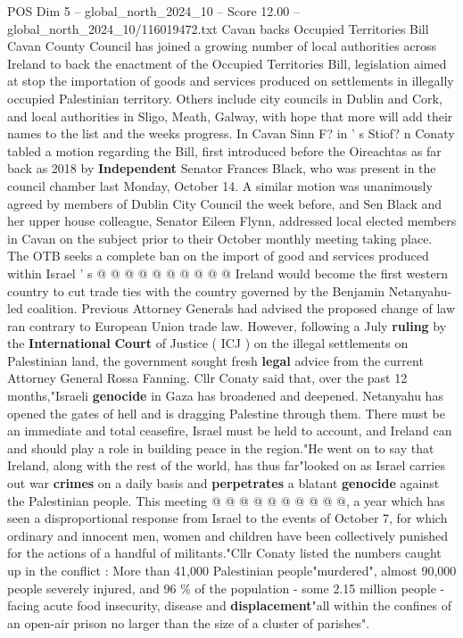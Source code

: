 \begin{textsample}{POS Dim 5 – global\_north\_2024\_10 – Score 12.00 – global\_north\_2024\_10/116019472.txt}  \label{ex:f5_pos_407}
Cavan backs Occupied Territories Bill Cavan County Council has joined a growing number of local authorities across Ireland to back the enactment of the Occupied Territories Bill, legislation aimed at stop the importation of goods and services produced on settlements in illegally occupied Palestinian territory.
Others include city councils in Dublin and Cork, and local authorities in Sligo, Meath, Galway, with hope that more will add their names to the list and the weeks progress.
In Cavan Sinn F? in ' s Stiof? n Conaty tabled a motion regarding the Bill, first introduced before the Oireachtas as far back as 2018 by \textbf{Independent} Senator Frances Black, who was present in the council chamber last Monday, October 14.
A similar motion was unanimously agreed by members of Dublin City Council the week before, and Sen Black and her upper house colleague, Senator Eileen Flynn, addressed local elected members in Cavan on the subject prior to their October monthly meeting taking place.
The OTB seeks a complete ban on the import of good and services produced within Israel ' s @ @ @ @ @ @ @ @ @ @ Ireland would become the first western country to cut trade ties with the country governed by the Benjamin Netanyahu-led coalition.
Previous Attorney Generals had advised the proposed change of law ran contrary to European Union trade law.
However, following a July \textbf{ruling} by the \textbf{International} \textbf{Court} of Justice ( ICJ ) on the illegal settlements on Palestinian land, the government sought fresh \textbf{legal} advice from the current Attorney General Rossa Fanning.
Cllr Conaty said that, over the past 12 months,"Israeli \textbf{genocide} in Gaza has broadened and deepened.
Netanyahu has opened the gates of hell and is dragging Palestine through them.
There must be an immediate and total ceasefire, Israel must be held to account, and Ireland can and should play a role in building peace in the region."He went on to say that Ireland, along with the rest of the world, has thus far"looked on as Israel carries out war \textbf{crimes} on a daily basis and \textbf{perpetrates} a blatant \textbf{genocide} against the Palestinian people.
This meeting @ @ @ @ @ @ @ @ @ @, a year which has seen a disproportional response from Israel to the events of October 7, for which ordinary and innocent men, women and children have been collectively punished for the actions of a handful of militants."Cllr Conaty listed the numbers caught up in the conflict : More than 41,000 Palestinian people"murdered", almost 90,000 people severely injured, and 96 \% of the population - some 2.15 million people - facing acute food insecurity, disease and \textbf{displacement}"all within the confines of an open-air prison no larger than the size of a cluster of parishes".

\end{textsample}
